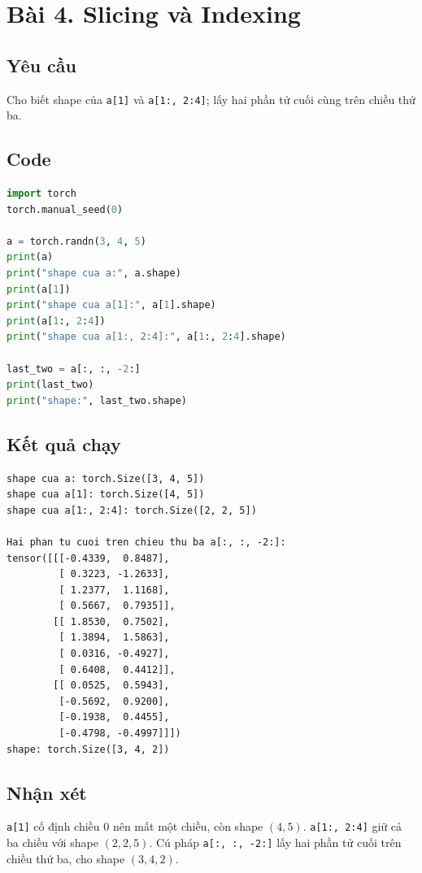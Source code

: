 \documentclass[a4paper,13pt]{article}
\begin{document}
\newpage
\section{Bài 4. Slicing và Indexing}

\subsection{Yêu cầu}
Cho biết shape của \texttt{a[1]} và \texttt{a[1:, 2:4]}; lấy hai phần tử cuối cùng trên chiều thứ ba.

\subsection{Code}
\begin{lstlisting}[language=Python]
import torch
torch.manual_seed(0)

a = torch.randn(3, 4, 5)
print(a)
print("shape cua a:", a.shape)
print(a[1])
print("shape cua a[1]:", a[1].shape)
print(a[1:, 2:4])
print("shape cua a[1:, 2:4]:", a[1:, 2:4].shape)

last_two = a[:, :, -2:]
print(last_two)
print("shape:", last_two.shape)
\end{lstlisting}

\subsection{Kết quả chạy}
\begin{lstlisting}[backgroundcolor=\color{outgray}]
shape cua a: torch.Size([3, 4, 5])
shape cua a[1]: torch.Size([4, 5])
shape cua a[1:, 2:4]: torch.Size([2, 2, 5])

Hai phan tu cuoi tren chieu thu ba a[:, :, -2:]:
tensor([[[-0.4339,  0.8487],
         [ 0.3223, -1.2633],
         [ 1.2377,  1.1168],
         [ 0.5667,  0.7935]],
        [[ 1.8530,  0.7502],
         [ 1.3894,  1.5863],
         [ 0.0316, -0.4927],
         [ 0.6408,  0.4412]],
        [[ 0.0525,  0.5943],
         [-0.5692,  0.9200],
         [-0.1938,  0.4455],
         [-0.4798, -0.4997]]])
shape: torch.Size([3, 4, 2])
\end{lstlisting}

\subsection{Nhận xét}
\texttt{a[1]} cố định chiều 0 nên mất một chiều, còn shape $(4,5)$. \texttt{a[1:, 2:4]} giữ cả ba chiều với shape $(2,2,5)$. Cú pháp \texttt{a[:, :, -2:]} lấy hai phần tử cuối trên chiều thứ ba, cho shape $(3,4,2)$.
\end{document}
